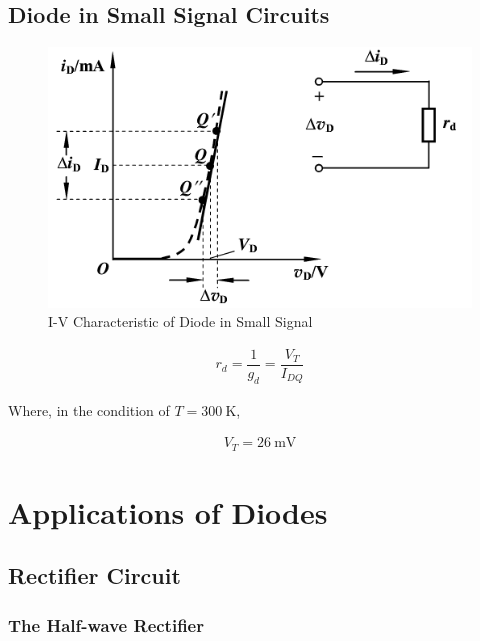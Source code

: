 \subsection{Diode in Small Signal Circuits}

\begin{figure}[H]
  \centering
  \includegraphics[width=0.7\linewidth]{figures/Diode-Small-Signal}
  \caption{I-V Characteristic of Diode in Small Signal}
\end{figure}

\begin{equation*}
  \begin{aligned}
    r_d = \dfrac{1}{g_d} = \dfrac{V_T}{I_{DQ}}  
  \end{aligned}
\end{equation*}

Where, in the condition of $T = 300 \  \mathrm{K}$,

\begin{equation*}
  \begin{aligned}
    V_T = 26 \  \mathrm{mV}
  \end{aligned}
\end{equation*}

\section{Applications of Diodes}

\subsection{Rectifier Circuit}

\subsubsection{The Half-wave Rectifier}

